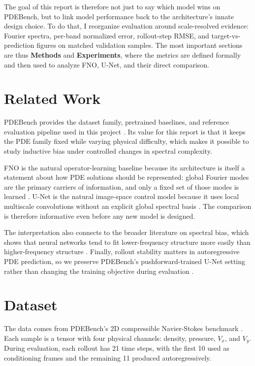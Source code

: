 \documentclass[11pt]{article}
\begin{document}
The goal of this report is therefore not just to say which model wins on PDEBench, but to link model performance back to the architecture's innate design choice. To do that, I reorganize evaluation around scale-resolved evidence: Fourier spectra, per-band normalized error, rollout-step RMSE, and target-vs-prediction figures on matched validation samples. The most important sections are thus \textbf{Methods} and \textbf{Experiments}, where the metrics are defined formally and then used to analyze FNO, U-Net, and their direct comparison.

\section{Related Work}
PDEBench provides the dataset family, pretrained baselines, and reference evaluation pipeline used in this project \cite{takamoto2022pdebench}. Its value for this report is that it keeps the PDE family fixed while varying physical difficulty, which makes it possible to study inductive bias under controlled changes in spectral complexity.

FNO is the natural operator-learning baseline because its architecture is itself a statement about how PDE solutions should be represented: global Fourier modes are the primary carriers of information, and only a fixed set of those modes is learned \cite{li2021fourier}. U-Net is the natural image-space control model because it uses local multiscale convolutions without an explicit global spectral basis \cite{ronneberger2015unet}. The comparison is therefore informative even before any new model is designed.

The interpretation also connects to the broader literature on spectral bias, which shows that neural networks tend to fit lower-frequency structure more easily than higher-frequency structure \cite{rahaman2019spectral}. Finally, rollout stability matters in autoregressive PDE prediction, so we preserve PDEBench's pushforward-trained U-Net setting rather than changing the training objective during evaluation \cite{brandstetter2022message}.

\section{Dataset}
The data comes from PDEBench's 2D compressible Navier-Stokes benchmark \cite{takamoto2022pdebench}. Each sample is a tensor with four physical channels: density, pressure, $V_x$, and $V_y$. During evaluation, each rollout has 21 time steps, with the first 10 used as conditioning frames and the remaining 11 produced autoregressively.
\end{document}
